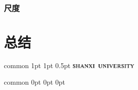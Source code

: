 \documentclass[
    report,     %
    oneside,    %
    UTF8,       %
    zihao=-4    %
]{config} %
\begin{document}
\subsection{尺度}
\chapter{总结}









\Header
    {common} %
    {1pt} %
    {1pt} %
    {0.5pt} %
    {} %
    {\includegraphics[width=0.25\textwidth]{figures/logos/SXU-title-EN.png}} %
    {} %


\Footer
    {common} %
    {0pt} %
    {0pt} %
    {0pt} %
    {} %
    {\thepage} %
    {} %





\end{document}
